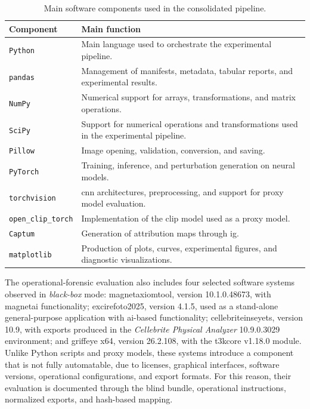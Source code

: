 \begin{table}[H]
\centering
\caption{Main software components used in the consolidated pipeline.}
\label{tab:software-environment}
\begin{tabularx}{\textwidth}{@{}lX@{}}
\toprule
\textbf{Component} & \textbf{Main function} \\
\midrule
\texttt{Python} & Main language used to orchestrate the experimental pipeline. \\
\texttt{pandas} & Management of manifests, metadata, tabular reports, and experimental results. \\
\texttt{NumPy} & Numerical support for arrays, transformations, and matrix operations. \\
\texttt{SciPy} & Support for numerical operations and transformations used in the experimental pipeline. \\
\texttt{Pillow} & Image opening, validation, conversion, and saving. \\
\texttt{PyTorch} & Training, inference, and perturbation generation on neural models. \\
\texttt{torchvision} & \gls{cnn} architectures, preprocessing, and support for proxy model evaluation. \\
\texttt{open\_clip\_torch} & Implementation of the \gls{clip} model used as a proxy model. \\
\texttt{Captum} & Generation of attribution maps through \gls{ig}. \\
\texttt{matplotlib} & Production of plots, curves, experimental figures, and diagnostic visualizations. \\
\bottomrule
\end{tabularx}
\end{table}

The operational-forensic evaluation also includes four selected software systems
observed in \textit{black-box} mode: \gls{magnetaxiomtool}, version
10.1.0.48673, with \gls{magnetai} functionality; \gls{excirefoto2025}, version
4.1.5, used as a stand-alone general-purpose application with \gls{ai}-based
functionality; \gls{cellebriteinseyets}, version 10.9, with exports produced in
the \textit{Cellebrite Physical Analyzer} 10.9.0.3029 environment; and
\gls{griffeye} x64, version 26.2.108, with the \gls{t3kcore} v1.18.0 module.
Unlike Python scripts and proxy models, these systems introduce a component that
is not fully automatable, due to licenses, graphical interfaces, software
versions, operational configurations, and export formats. For this reason, their
evaluation is documented through the blind bundle, operational instructions,
normalized exports, and hash-based mapping.


